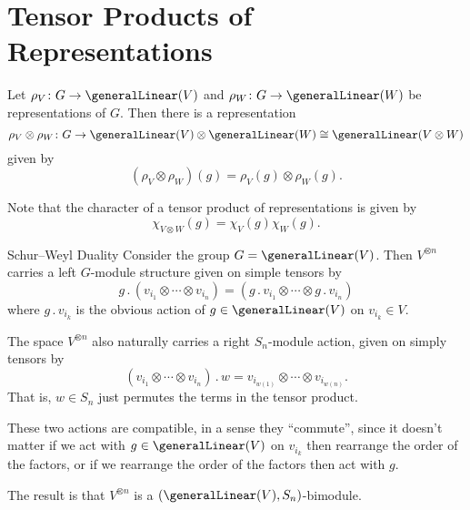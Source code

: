 \documentclass[fleqn]{NotesClass}
\newcommand{\action}{\mathbin{.}}
\newcommand{\isomorphic}{\cong}
\begin{document}
    \section{Tensor Products of Representations}
    \begin{dfn}{}{}
        Let \(\rho_V \colon G \to \generalLinear(V)\) and \(\rho_W \colon G \to \generalLinear(W)\) be representations of \(G\).
        Then there is a representation
        \begin{equation}
            \rho_V \otimes \rho_W \colon G \to \generalLinear(V) \otimes \generalLinear(W) \isomorphic \generalLinear(V \otimes W)
        \end{equation}
        given by
        \begin{equation}
            (\rho_V \otimes \rho_W)(g) = \rho_V(g) \otimes \rho_W(g).
        \end{equation}
    \end{dfn}
    
    Note that the character of a tensor product of representations is given by
    \begin{equation}
        \chi_{V \otimes W}(g) = \chi_V(g) \chi_W(g).
    \end{equation}
    
    \begin{exm}{Schur--Weyl Duality}{}
        Consider the group \(G = \generalLinear(V)\).
        Then \(V^{\otimes n}\) carries a left \(G\)-module structure given on simple tensors by
        \begin{equation}
            g \action (v_{i_1} \otimes \dotsb \otimes v_{i_n}) = (g \action v_{i_1} \otimes \dotsb \otimes g \action v_{i_n})
        \end{equation}
        where \(g \action v_{i_k}\) is the obvious action of \(g \in \generalLinear(V)\) on \(v_{i_k} \in V\).
        
        The space \(V^{\otimes n}\) also naturally carries a right \(S_n\)-module action, given on simply tensors by
        \begin{equation}
            (v_{i_1} \otimes \dotsb \otimes v_{i_n}) \action w = v_{i_{w(1)}} \otimes \dotsb \otimes v_{i_{w(n)}}.
        \end{equation}
        That is, \(w \in S_n\) just permutes the terms in the tensor product.
        
        These two actions are compatible, in a sense they \enquote{commute}, since it doesn't matter if we act with \(g \in \generalLinear(V)\) on \(v_{i_k}\) then rearrange the order of the factors, or if we rearrange the order of the factors then act with \(g\).
        
        The result is that \(V^{\otimes n}\) is a \((\generalLinear(V), S_n)\)-bimodule.
    \end{exm}
    
\end{document}
